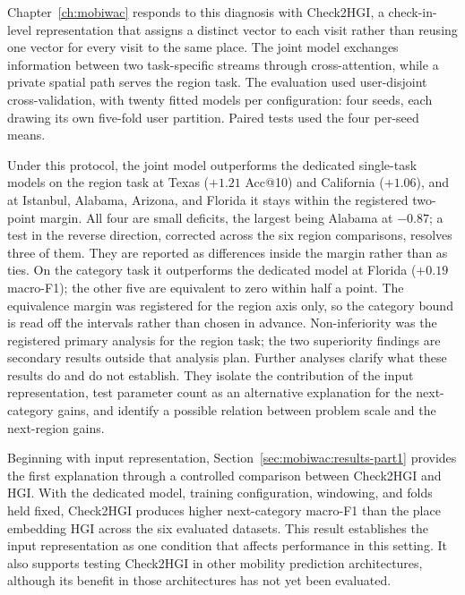 Chapter~\ref{ch:mobiwac} responds to this diagnosis with Check2HGI, a check-in-level
representation that assigns a distinct vector to each visit rather than reusing one
vector for every visit to the same place. The joint model exchanges information between
two task-specific streams through cross-attention, while a private spatial path serves
the region task. The evaluation used user-disjoint cross-validation, with twenty fitted
models per configuration: four seeds, each drawing its own five-fold user partition.
Paired tests used the four per-seed means.

Under this protocol, the joint model outperforms the dedicated single-task models on the
region task at Texas ($+1.21$ Acc@10) and California ($+1.06$), and at Istanbul, Alabama,
Arizona, and Florida it stays within the registered two-point margin. All four are small
deficits, the largest being Alabama at $-0.87$; a test in the reverse direction, corrected across
the six region comparisons, resolves three of them. They are reported as differences inside the
margin rather than as ties. On
the category task it outperforms the dedicated model at Florida ($+0.19$ macro-F1); the
other five are equivalent to zero within half a point. The equivalence margin was registered for
the region axis only, so the category bound is read off the intervals rather than chosen in advance.
Non-inferiority was the registered primary analysis for the region task; the
two superiority findings are secondary results outside that analysis plan. Further analyses
clarify what these results do and do not establish. They isolate the contribution of the
input representation, test parameter count as an alternative explanation for the next-category
gains, and identify a possible relation between problem scale and the next-region gains.

Beginning with input representation, Section~\ref{sec:mobiwac:results-part1} provides the first
explanation through a controlled comparison between Check2HGI and HGI. With the dedicated
model, training configuration, windowing, and folds held fixed, Check2HGI produces higher
next-category macro-F1 than the place embedding HGI across the six evaluated datasets.
This result establishes the input representation as one condition that affects
performance in this setting. It also supports testing Check2HGI in other mobility
prediction architectures, although its benefit in those architectures has not yet been
evaluated.

